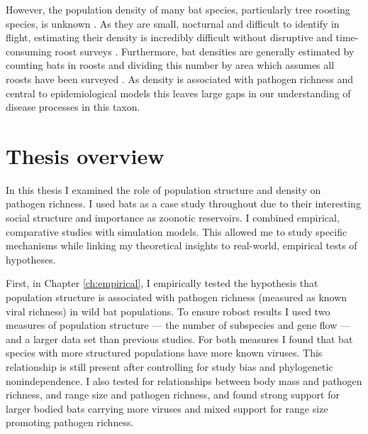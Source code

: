 However, the population density of many bat species, particularly tree roosting species, is unknown \cite{clement2013estimating}.
As they are small, nocturnal and difficult to identify in flight, estimating their density is incredibly difficult without disruptive and time-consuming roost surveys \cite{kloepper2016estimating, humphrey1971photographic, sabol1995technique}.
Furthermore, bat densities are generally estimated by counting bats in roosts and dividing this number by area which assumes all roosts have been surveyed \cite{speakman1991minimum, zahn2006population, moreno2004colony}. 
As density is associated with pathogen richness \cite{kamiya2014determines} and central to epidemiological models \cite{may1979population, anderson1979population} this leaves large gaps in our understanding of disease processes in this taxon.





\section{Thesis overview}

In this thesis I examined the role of population structure and density on pathogen richness.
I used bats as a case study throughout due to their interesting social structure and importance as zoonotic	reservoirs.
I combined empirical, comparative studies with simulation models.
This allowed me to study specific mechanisms while linking my theoretical insights to real-world, empirical tests of hypotheses.



First, in Chapter \ref{ch:empirical}, I empirically tested the hypothesis that population structure is associated with pathogen richness (measured as known viral richness) in wild bat populations.
To ensure robost results I used two measures of population structure --- the number of subspecies and gene flow --- and a larger data set than previous studies.
For both measures I found that bat species with more structured populations have more known viruses.
This relationship is still present after controlling for study bias and phylogenetic nonindependence.
I also tested for relationships between body mass and pathogen richness, and range size and pathogen richness, and found strong support for larger bodied bats carrying more viruses and mixed support for range size promoting pathogen richness.


